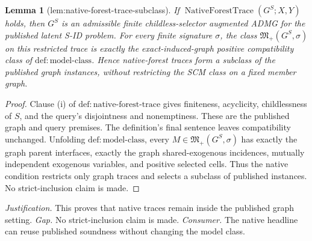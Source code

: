 \documentclass{article}
\newtheorem{lemma}{Lemma}
\begin{document}
\begin{lemma}[lem:native-forest-trace-subclass]\label{lem:native-forest-trace-subclass}
If \(\operatorname{NativeForestTrace}(G^S;X,Y)\) holds, then \(G^S\) is an admissible finite childless-selector augmented ADMG for the published latent S-ID problem. For every finite signature \(\sigma\), the class \(\mathfrak M_+(G^S,\sigma)\) on this restricted trace is exactly the exact-induced-graph positive compatibility class of \(\mathrm{def:model\text{-}class}\). Hence native-forest traces form a subclass of the published graph instances, without restricting the SCM class on a fixed member graph.
\end{lemma}
\begin{proof}
Clause (i) of \(\mathrm{def:native\text{-}forest\text{-}trace}\) gives finiteness, acyclicity, childlessness of \(S\), and the query's disjointness and nonemptiness. These are the published graph and query premises. The definition's final sentence leaves compatibility unchanged. Unfolding \(\mathrm{def:model\text{-}class}\), every \(M\in\mathfrak M_+(G^S,\sigma)\) has exactly the graph parent interfaces, exactly the graph shared-exogenous incidences, mutually independent exogenous variables, and positive selected cells. Thus the native condition restricts only graph traces and selects a subclass of published instances. No strict-inclusion claim is made.
\end{proof}
\par\smallskip\noindent \textit{Justification.} This proves that native traces remain inside the published graph setting. \textit{Gap.} No strict-inclusion claim is made. \textit{Consumer.} The native headline can reuse published soundness without changing the model class.
\end{document}
